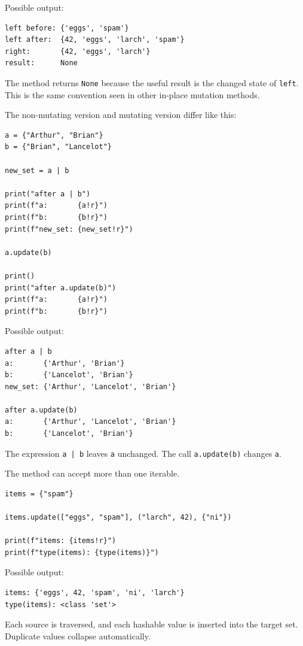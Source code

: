 Possible output:

\begin{verbatim}
left before: {'eggs', 'spam'}
left after:  {42, 'eggs', 'larch', 'spam'}
right:       {42, 'eggs', 'larch'}
result:      None
\end{verbatim}

The method returns \texttt{None} because the useful result is the changed state of \texttt{left}. This is the same convention seen in other in-place mutation methods.

The non-mutating version and mutating version differ like this:

\begin{verbatim}
a = {"Arthur", "Brian"}
b = {"Brian", "Lancelot"}

new_set = a | b

print("after a | b")
print(f"a:       {a!r}")
print(f"b:       {b!r}")
print(f"new_set: {new_set!r}")

a.update(b)

print()
print("after a.update(b)")
print(f"a:       {a!r}")
print(f"b:       {b!r}")
\end{verbatim}

Possible output:

\begin{verbatim}
after a | b
a:       {'Arthur', 'Brian'}
b:       {'Lancelot', 'Brian'}
new_set: {'Arthur', 'Lancelot', 'Brian'}

after a.update(b)
a:       {'Arthur', 'Lancelot', 'Brian'}
b:       {'Lancelot', 'Brian'}
\end{verbatim}

The expression \texttt{a | b} leaves \texttt{a} unchanged. The call \texttt{a.update(b)} changes \texttt{a}.

The method can accept more than one iterable.

\begin{verbatim}
items = {"spam"}

items.update(["eggs", "spam"], ("larch", 42), {"ni"})

print(f"items: {items!r}")
print(f"type(items): {type(items)}")
\end{verbatim}

Possible output:

\begin{verbatim}
items: {'eggs', 42, 'spam', 'ni', 'larch'}
type(items): <class 'set'>
\end{verbatim}

Each source is traversed, and each hashable value is inserted into the target set. Duplicate values collapse automatically.

